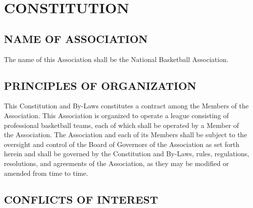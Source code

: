 \documentclass[]{book}
\begin{document}
\hypertarget{constitution}{%
\chapter{CONSTITUTION}\label{constitution}}

\hypertarget{name-of-association}{%
\section{NAME OF ASSOCIATION}\label{name-of-association}}

The name of this Association shall be the National Basketball Association.

\hypertarget{principles-of-organization}{%
\section{PRINCIPLES OF ORGANIZATION}\label{principles-of-organization}}

This Constitution and By-Laws constitutes a contract among the Members of the Association. This Association is organized to operate a league consisting of professional basketball teams, each of which shall be operated by a Member of the Association. The Association and each of its Members shall be subject to the oversight and control of the Board of Governors of the Association as set forth herein and shall be governed by the Constitution and By-Laws, rules, regulations, resolutions, and agreements of the Association, as they may be modified or amended from time to time.

\hypertarget{conflicts-of-interest}{%
\section{CONFLICTS OF INTEREST}\label{conflicts-of-interest}}
\end{document}

